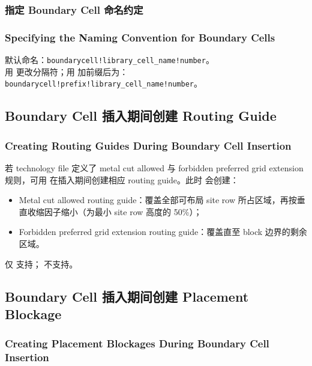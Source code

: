 \subsubsection{指定 Boundary Cell 命名约定}
\subsubsection*{Specifying the Naming Convention for Boundary Cells}

默认命名：\texttt{boundarycell!library\_cell\_name!number}。\\
用  更改分隔符；用  加前缀后为：\texttt{boundarycell!prefix!library\_cell\_name!number}。

\subsection{Boundary Cell 插入期间创建 Routing Guide}
\subsubsection*{Creating Routing Guides During Boundary Cell Insertion}

若 technology file 定义了 metal cut allowed 与 forbidden preferred grid extension 规则，可用  在插入期间创建相应 routing guide。此时  会创建：
\begin{itemize}
  \item Metal cut allowed routing guide：覆盖全部可布局 site row 所占区域，再按垂直收缩因子缩小（为最小 site row 高度的 50\%）；
  \item Forbidden preferred grid extension routing guide：覆盖直至 block 边界的剩余区域。
\end{itemize}

\begin{noteBox}
仅  支持； 不支持。
\end{noteBox}

\subsection{Boundary Cell 插入期间创建 Placement Blockage}
\subsubsection*{Creating Placement Blockages During Boundary Cell Insertion}

